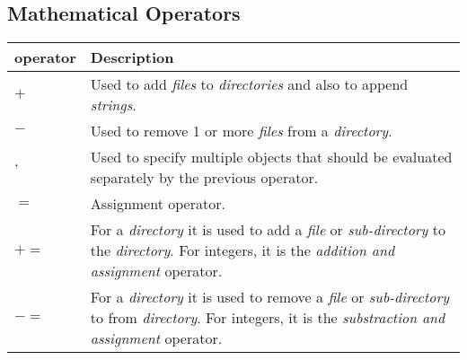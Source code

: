 \documentclass[11pt]{article}
\begin{document}
\newpage
\subsection{Mathematical Operators}

\begin{table}[ht]
  \centering
  \vspace{0.5em}
  \begin{tabular}{|m{8em}|b{34em}|}
  \hline

  \textbf{operator}
  &
  \vspace{0.7em}
  \textbf{Description} \\ [0.7em]
  \hline

  $+$
  &
  \vspace{0.7em}
  Used to add \emph{files} to \emph{directories} and also to append \emph{strings}.
  \\[0.7em]
  \hline

  $-$
  &
  \vspace{0.7em}
  Used to remove 1 or more \emph{files} from a \emph{directory}.
  \\[0.7em]
  \hline

  \vspace{-0.9em}
  $,$
  &
  \vspace{0.7em}
  Used to specify multiple objects that should be evaluated separately by the previous operator.
  \\[0.7em]
  \hline

  $=$
  &
  \vspace{0.7em}
  Assignment operator.
  \\[0.7em]
  \hline

  \vspace{-0.9em}
  $+=$
  &
  \vspace{0.7em}
  For a \emph{directory} it is used to add a \emph{file} or \emph{sub-directory} to the \emph{directory}. For integers, it is the \emph{addition and assignment} operator.
  \\[0.7em]
  \hline

  \vspace{-0.9em}
  $-=$
  &
  \vspace{0.7em}
  For a \emph{directory} it is used to remove a \emph{file} or \emph{sub-directory} to from \emph{directory}. For integers, it is the \emph{substraction and assignment} operator.
  \\[0.7em]
  \hline

  \end{tabular}
\end{table}
\end{document}
